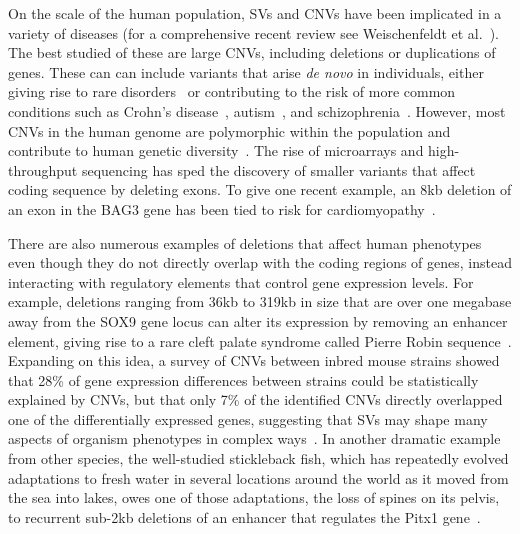 On the scale of the human population, SVs and CNVs have been implicated in a variety of diseases (for a comprehensive recent review see Weischenfeldt et al.~\cite{Weischenfeldt:2013fm}). The best studied of these are large CNVs, including deletions or duplications of genes. These can can include variants that arise \emph{de novo} in individuals, either giving rise to rare disorders~\cite{Lupski:1998ip} or contributing to the risk of more common conditions such as Crohn's disease~\cite{McCarroll:2008jt}, autism~\cite{Sebat:2007bs}, and schizophrenia~\cite{Walsh:2008kp}. However, most CNVs in the human genome are polymorphic within the population and contribute to human genetic diversity~\cite{McCarroll:2008p265}. The rise of microarrays and high-throughput sequencing has sped the discovery of smaller variants that affect coding sequence by deleting exons. To give one recent example, an 8kb deletion of an exon in the BAG3 gene has been tied to risk for cardiomyopathy~\cite{Norton:2011ev}. 

There are also numerous examples of deletions that affect human phenotypes even though they do not directly overlap with the coding regions of genes, instead interacting with regulatory elements that control gene expression levels. For example, deletions ranging from 36kb to 319kb in size that are over one megabase away from the SOX9 gene locus can alter its expression by removing an enhancer element, giving rise to a rare cleft palate syndrome called Pierre Robin sequence~\cite{Benko:2009dq}. Expanding on this idea, a survey of CNVs between inbred mouse strains showed that 28\% of gene expression differences between strains could be statistically explained by CNVs, but that only 7\% of the identified CNVs directly overlapped one of the differentially expressed genes, suggesting that SVs may shape many aspects of organism phenotypes in complex ways~\cite{Cahan:2009ef}. In another dramatic example from other species, the well-studied stickleback fish, which has repeatedly evolved adaptations to fresh water in several locations around the world as it moved from the sea into lakes, owes one of those adaptations, the loss of spines on its pelvis, to recurrent sub-2kb deletions of an enhancer that regulates the Pitx1 gene~\cite{Chan:2010hz}.


